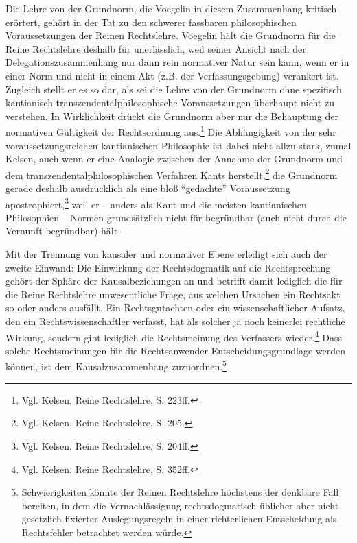 \documentclass[12pt,a4paper,ngerman]{article}
\begin{document}
Die Lehre von der Grundnorm, die Voegelin in diesem Zusammenhang kritisch
erörtert, gehört in der Tat zu den schwerer fassbaren philosophischen
Voraussetzungen der Reinen Rechtslehre.  Voegelin hält die Grundnorm für die
Reine Rechtslehre deshalb für unerlässlich, weil seiner Ansicht nach der
Delegationszusammenhang nur dann rein normativer Natur sein kann, wenn er in
einer Norm und nicht in einem Akt (z.B.  der Verfassungsgebung) verankert ist.
Zugleich stellt er es so dar, als sei die Lehre von der Grundnorm ohne
spezifisch kantianisch-transzendentalphilosophische Voraussetzungen überhaupt
nicht zu verstehen. In Wirklichkeit drückt die Grundnorm aber nur die
Behauptung der normativen Gültigkeit der Rechtsordnung aus.\footnote{Vgl.
  Kelsen, Reine Rechtslehre, S. 223ff. 
}  Die Abhängigkeit von der sehr
voraussetzungsreichen kantianischen Philosophie ist dabei nicht allzu stark,
zumal Kelsen, auch wenn er eine Analogie zwischen der Annahme der Grundnorm
und dem transzendentalphilosophischen Verfahren Kants herstellt,\footnote{Vgl.
  Kelsen, Reine Rechtslehre, S. 205.}  die Grundnorm gerade deshalb
ausdrücklich als eine bloß "`gedachte"' Voraussetzung
apostrophiert,\footnote{Vgl. Kelsen, Reine Rechtslehre, S. 204ff.}  weil er --
anders als Kant und die meisten kantianischen Philosophien -- Normen
grundsätzlich nicht für begründbar (auch nicht durch die Vernunft begründbar)
hält.

Mit der Trennung von kausaler und normativer Ebene erledigt sich auch
der zweite Einwand: Die Einwirkung der Rechtsdogmatik auf die
Rechtsprechung gehört der Sphäre der Kausalbeziehungen an und betrifft
damit lediglich die für die Reine Rechtslehre unwesentliche Frage, aus
welchen Ursachen ein Rechtsakt so oder anders ausfällt. Ein
Rechtsgutachten oder ein wissenschaftlicher Aufsatz, den ein
Rechtswissenschaftler verfasst, hat als solcher ja noch keinerlei
rechtliche Wirkung, sondern gibt lediglich die Rechtsmeinung des
Verfassers wieder.\footnote{Vgl. Kelsen, Reine Rechtslehre, S. 352ff.}
Dass solche Rechtsmeinungen für die Rechtsanwender
Entscheidungsgrundlage werden können, ist dem Kausalzusammenhang
zuzuordnen.\footnote{Schwierigkeiten könnte der Reinen Rechtslehre
  höchstens der denkbare Fall bereiten, in dem die Vernachlässigung
  rechtsdogmatisch üblicher aber nicht gesetzlich fixierter
  Auslegungsregeln in einer richterlichen Entscheidung als
  Rechtsfehler betrachtet werden würde.}
\end{document}
